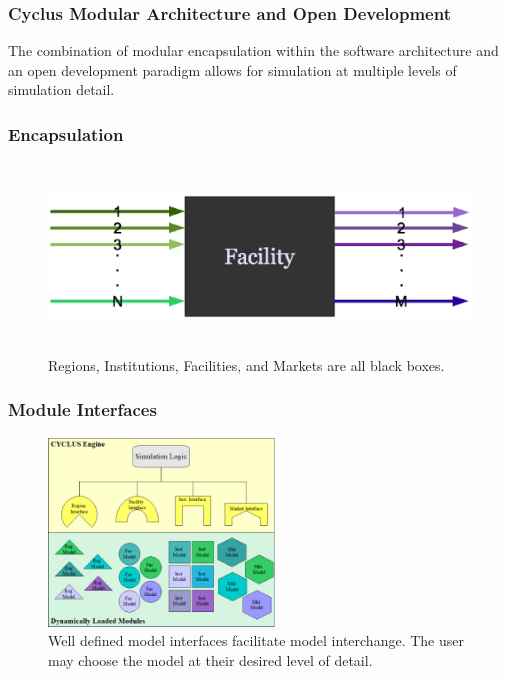\begin{frame}
  \frametitle{Cyclus Modular Architecture and Open Development}
  The combination of modular encapsulation within the software
  architecture and an open development paradigm allows for simulation
  at multiple levels of simulation detail.
\end{frame}
\begin{frame}[ctb!]
  \frametitle{Encapsulation}
  \begin{figure}[htbp!]
    \begin{center}
      \includegraphics[height=5cm]{./images/facility.eps}
    \end{center}
    \caption{ Regions, Institutions, Facilities, and Markets are all
    black boxes.} 
    \label{fig:sinkfacility}
  \end{figure}
\end{frame}
\begin{frame}[ctb!]
  \frametitle{Module Interfaces}
  \begin{figure}[htbp!]
    \begin{center}
      \includegraphics[height=5cm]{./images/interfaces.eps}
    \caption{Well defined model interfaces facilitate model 
    interchange. The user may choose the model at their desired level  
    of detail.}
    \label{fig:interfaces}
    \end{center}
  \end{figure}
\end{frame}

